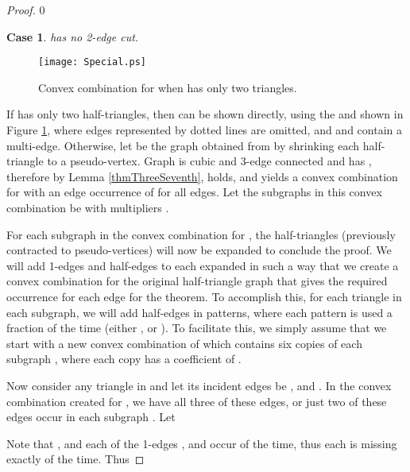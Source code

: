 \documentclass[oneeqnum,final]{siamltex1213}
\newtheorem{case}{Case}
\begin{document}
\begin{proof}
\setcounter {case} {0}

\begin{case}\label{case1}
 has no 2-edge cut.
\end{case}
\begin{figure}
\begin{center}
\texttt{[image: Special.ps]}
\end{center}
\caption{Convex combination for  when  has only two triangles.}
\label{SpecialCase}
\end{figure}
If  has only two half-triangles, then  can be shown directly, using the  and  shown in Figure \ref{SpecialCase}, where edges represented by dotted lines are omitted, and  and  contain a multi-edge. Otherwise, let \mbox{} be the graph obtained from  by shrinking each half-triangle to a pseudo-vertex. Graph  is cubic and 3-edge connected and has , therefore by Lemma \ref{thmThreeSeventh},  holds, and yields a convex combination for  with an edge occurrence of  for all edges. Let the subgraphs in this convex combination be  with multipliers .

For each subgraph  in the convex combination for , the half-triangles (previously contracted to pseudo-vertices) will now be expanded to conclude the proof. We will add 1-edges and half-edges to each expanded  in such a way that we create a convex combination for the original half-triangle graph  that gives the required occurrence for each edge for the theorem. To accomplish this, for each triangle  in each subgraph, we will add half-edges in patterns, where each pattern is used a fraction of the time (either , or ). To facilitate this, we simply assume that we start with a new convex combination of  which contains six copies of each subgraph , where each copy has a coefficient of . 

Now consider any triangle  in  and let its incident edges be ,  and . In the convex combination created for , we have all three of these edges, or just two of these edges occur in each subgraph . Let 

Note that , and each of the 1-edges ,  and  occur  of the time, thus each is missing exactly  of the time. Thus



\end{proof}
\end{document}
